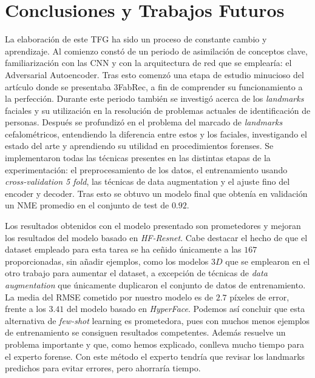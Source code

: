 \chapter{Conclusiones y Trabajos Futuros}

\noindent La elaboración de este TFG ha sido un proceso de constante cambio y aprendizaje. Al comienzo constó de un periodo de asimilación de conceptos clave, familiarización con las CNN y con la arquitectura de red que se emplearía: el Adversarial Autoencoder. Tras esto comenzó una etapa de estudio minucioso del artículo donde se presentaba 3FabRec, a fin de comprender su funcionamiento a la perfección. Durante este periodo también se investigó acerca de los \textit{landmarks} faciales y su utilización en la resolución de problemas actuales de identificación de personas. Después se profundizó en el problema del marcado de \textit{landmarks} cefalométricos, entendiendo la diferencia entre estos y los faciales, investigando el estado del arte y aprendiendo su utilidad en procedimientos forenses. Se implementaron todas las técnicas presentes en las distintas etapas de la experimentación: el preprocesamiento de los datos, el entrenamiento usando \textit{cross-validation 5 fold}, las técnicas de data augmentation y el ajuste fino del encoder y decoder. Tras esto se obtuvo un modelo final que obtenía en validación un NME promedio en el conjunto de test de $0.92$.

\medskip

\noindent Los resultados obtenidos con el modelo presentado son prometedores y mejoran los resultados del modelo basado en \textit{HF-Resnet}. Cabe destacar el hecho de que el dataset empleado para esta tarea se ha ceñido únicamente a las $167$ proporcionadas, sin añadir ejemplos, como los modelos $3D$ que se emplearon en el otro trabajo para aumentar el dataset, a excepción de técnicas de \textit{data augmentation} que únicamente duplicaron el conjunto de datos de entrenamiento. La media del RMSE cometido por nuestro modelo es de $2.7$ píxeles de error, frente a los $3.41$ del modelo basado en \textit{HyperFace}. Podemos así concluir que esta alternativa de \textit{few-shot} learning es prometedora, pues con muchos menos ejemplos de entrenamiento se consiguen resultados competentes. Además resuelve un problema importante y que, como hemos explicado, conlleva mucho tiempo para el experto forense. Con este método el experto tendría que revisar los landmarks predichos para evitar errores, pero ahorraría tiempo.

\medskip

